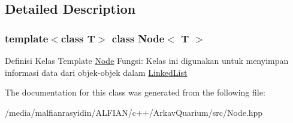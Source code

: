 \subsection{Detailed Description}
\subsubsection*{template$<$class T$>$\newline
class Node$<$ T $>$}

Definisi Kelas Template \mbox{\hyperlink{class_node}{Node}} Fungsi\+: Kelas ini digunakan untuk menyimpan informasi data dari objek-\/objek dalam \mbox{\hyperlink{class_linked_list}{Linked\+List}} 

The documentation for this class was generated from the following file\+:\begin{DoxyCompactItemize}
\item 
/media/malfianrasyidin/\+A\+L\+F\+I\+A\+N/c++/\+Arkav\+Quarium/src/Node.\+hpp\end{DoxyCompactItemize}
